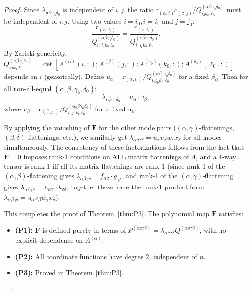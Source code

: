 \documentclass[12pt]{article}
\theoremstyle{definition}
\begin{document}
\begin{proof}
Since $\lambda_{\alpha\beta\gamma_0\delta_0}$ is independent of $i,j$, the ratio $r_{(\alpha,i)}c_{(\beta,j)}/Q^{(\alpha\beta\gamma_0\delta_0)}_{ijk_0\ell_0}$ must be independent of $i,j$. Using two values $i = i_0, i = i_1$ and $j = j_0$:
\[
\frac{r_{(\alpha,i_0)}}{Q^{(\alpha\beta\gamma_0\delta_0)}_{i_0j_0k_0\ell_0}} = \frac{r_{(\alpha,i_1)}}{Q^{(\alpha\beta\gamma_0\delta_0)}_{i_1j_0k_0\ell_0}}.
\]
By Zariski-genericity, $Q^{(\alpha\beta\gamma_0\delta_0)}_{ijk_0\ell_0} = \det[A^{(\alpha)}(i,:);A^{(\beta)}(j,:);A^{(\gamma_0)}(k_0,:);A^{(\delta_0)}(\ell_0,:)]$ depends on $i$ (generically). Define $u_\alpha = r_{(\alpha,i_0)}/Q^{(\alpha\beta_0\gamma_0\delta_0)}_{i_0j_0k_0\ell_0}$ for a fixed $\beta_0$. Then for all non-all-equal $(\alpha,\beta,\gamma_0,\delta_0)$:
\[
\lambda_{\alpha\beta\gamma_0\delta_0} = u_\alpha \cdot v_\beta,
\]
where $v_\beta = c_{(\beta,j_0)}/Q^{(\alpha_0\beta\gamma_0\delta_0)}_{i_0j_0k_0\ell_0}$ for a fixed $\alpha_0$.

By applying the vanishing of $\mathbf{F}$ for the other mode pairs ($(\alpha,\gamma)$-flattenings, $(\beta,\delta)$-flattenings, etc.), we similarly get $\lambda_{\alpha\beta\gamma\delta} = u_\alpha v_\beta w_\gamma x_\delta$ for all modes simultaneously. The consistency of these factorizations follows from the fact that $\mathbf{F} = 0$ imposes rank-1 conditions on ALL matrix flattenings of $\Lambda$, and a 4-way tensor is rank-1 iff all its matrix flattenings are rank-1 (since rank-1 of the $(\alpha,\beta)$-flattening gives $\lambda_{\alpha\beta\gamma\delta} = f_{\alpha\beta}\cdot g_{\gamma\delta}$, and rank-1 of the $(\alpha,\gamma)$-flattening gives $\lambda_{\alpha\beta\gamma\delta} = h_{\alpha\gamma}\cdot k_{\beta\delta}$; together these force the rank-1 product form $\lambda_{\alpha\beta\gamma\delta} = u_\alpha v_\beta w_\gamma x_\delta$).

\medskip
This completes the proof of Theorem~\ref{thm:P3}. The polynomial map $\mathbf{F}$ satisfies:
\begin{itemize}
\item \textbf{(P1):} $\mathbf{F}$ is defined purely in terms of $P^{(\alpha\beta\gamma\delta)} = \lambda_{\alpha\beta\gamma\delta}Q^{(\alpha\beta\gamma\delta)}$, with no explicit dependence on $A^{(\alpha)}$.
\item \textbf{(P2):} All coordinate functions have degree $2$, independent of $n$.
\item \textbf{(P3):} Proved in Theorem~\ref{thm:P3}.
\end{itemize}
\end{proof}
\end{document}
